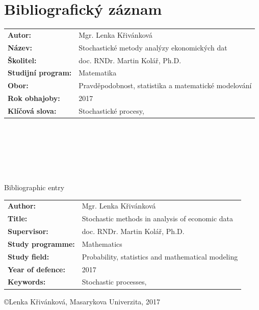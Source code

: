 \documentclass[a4paper,12pt]{report}
\theoremstyle{definition} \newtheorem{definice}[veta]{Definice}
\theoremstyle{remark}
\begin{document}
\normalsize



\chapter*{Bibliografický záznam}
\setcounter{page}{1}

\begin{tabular}{p{3.9cm}  p{9.1cm}}
\textbf{Autor:} & Mgr. Lenka Křivánková \\
\textbf{Název:} & Stochastické metody analýzy ekonomických dat \\
\textbf{Školitel:} & doc. RNDr. Martin Kolář, Ph.D.  \\
\textbf{Studijní program:} & Matematika \\
\textbf{Obor:} & Pravděpodobnost, statistika a matematické modelování \\
\textbf{Rok obhajoby:} & 2017 \\
\textbf{Klíčová slova:} & Stochastické procesy, \\
\end{tabular}
\\\\\\\\\\

\begin{flushright} {{\Huge Bibliographic entry}} \vspace{38pt} \end{flushright}

\hspace{-0.7cm}
\begin{tabular}{p{3.9cm}  p{9.1cm}}
\textbf{Author:} & Mgr. Lenka Křivánková \\
\textbf{Title:} & Stochastic methods in analysis of economic data \\
\textbf{Supervisor:} & doc. RNDr. Martin Kolář, Ph.D.  \\
\textbf{Study programme:} & Mathematics \\
\textbf{Study field:} & Probability, statistics and mathematical modeling \\
\textbf{Year of defence:} & 2017 \\
\textbf{Keywords:} & Stochastic processes, \\
\end{tabular}
\newpage
\pagestyle{empty}
\null
\vfill
\begin{center}
\copyright \quad Lenka Křivánková, Masarykova Univerzita, 2017
\end{center}
\end{document}
